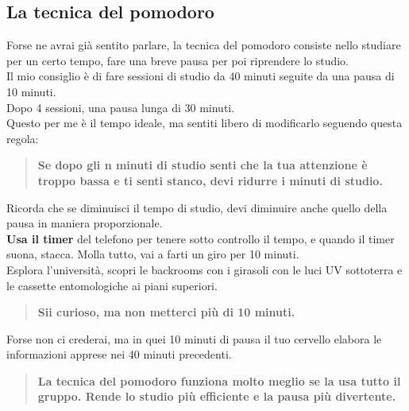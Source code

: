 \documentclass[18pt]{extarticle}
\begin{document}
\subsection{La tecnica del pomodoro}
Forse ne avrai già sentito parlare, la tecnica del pomodoro consiste nello studiare per un certo tempo, fare una breve pausa per poi riprendere lo studio.\\
Il mio consiglio è di fare sessioni di studio da 40 minuti seguite da una pausa di 10 minuti.\\
Dopo 4 sessioni, una pausa lunga di 30 minuti.\\
Questo per me è il tempo ideale, ma sentiti libero di modificarlo seguendo questa regola:
\begin{quote}
\textbf{Se dopo gli n minuti di studio senti che la tua attenzione è troppo bassa e ti senti stanco, devi ridurre i minuti di studio.}
\end{quote}
Ricorda che se diminuisci il tempo di studio, devi diminuire anche quello della pausa in maniera proporzionale.\\
\textbf{Usa il timer} del telefono per tenere sotto controllo il tempo, e quando il timer suona, stacca. Molla tutto, vai a farti un giro per 10 minuti.\\
Esplora l'università, scopri le backrooms con i girasoli con le luci UV sottoterra e le cassette entomologiche ai piani superiori.
\begin{quote}
\textbf{Sii curioso, ma non metterci più di 10 minuti.}
\end{quote}
Forse non ci crederai, ma in quei 10 minuti di pausa il tuo cervello elabora le informazioni apprese nei 40 minuti precedenti.
\begin{quote}
\textbf{La tecnica del pomodoro funziona molto meglio se la usa tutto il gruppo. Rende lo studio più efficiente e la pausa più divertente.}
\end{quote}%
\end{document}
